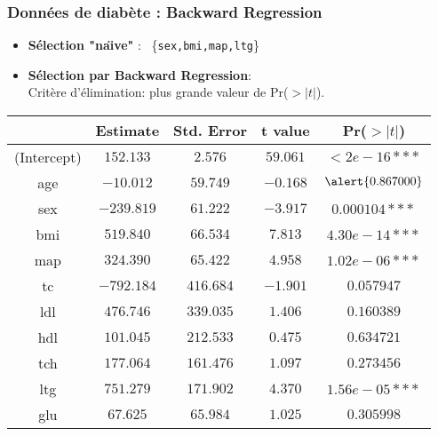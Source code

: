 \documentclass{beamer}
\begin{document}
\begin{frame}
\frametitle{Données de diab\`ete : Backward Regression}

\begin{itemize}
\item {\bf Sélection "na\"{\i}ve"} : \
\{\texttt{sex,bmi,map,ltg}\}
\item {\bf Sélection par Backward Regression}:\\
 \alert{Crit\`ere
d'élimination: plus grande valeur de} Pr($>|t|$).
\end{itemize}


{\small
\begin{tabular}{|c||c|c|c|c|}
\hline &Estimate&Std. Error&t value&Pr($>|t|$)\\\hline
(Intercept) &$152.133$&$2.576$&$59.061$&$< 2e-16***$\\
\alert{age}&$-10.012$&$59.749$&$
-0.168$&$\alert{0.867000}$\\\hline
sex &$-239.819$&$61.222$&$-3.917$&$0.000104***$\\
bmi&$519.840$&$66.534$&$7.813$&$4.30e-14***$\\\hline
map&$324.390$&$65.422$&$4.958$&$1.02e-06***$\\
tc&$-792.184$&$416.684$&$-1.901$&$0.057947$\\\hline
ldl&$476.746$&$339.035$&$1.406$&$0.160389$\\
hdl&$101.045$&$212.533 $&$0.475$&$0.634721$\\\hline
tch&$177.064$&$161.476$&$ 1.097$&$0.273456$\\
ltg&$751.279$&$ 171.902$&$4.370$&$ 1.56e-05***$\\\hline
glu&$67.625$&$ 65.984$&$1.025$&$0.305998$\\\hline
\end{tabular}
}
\end{frame}
\end{document}
